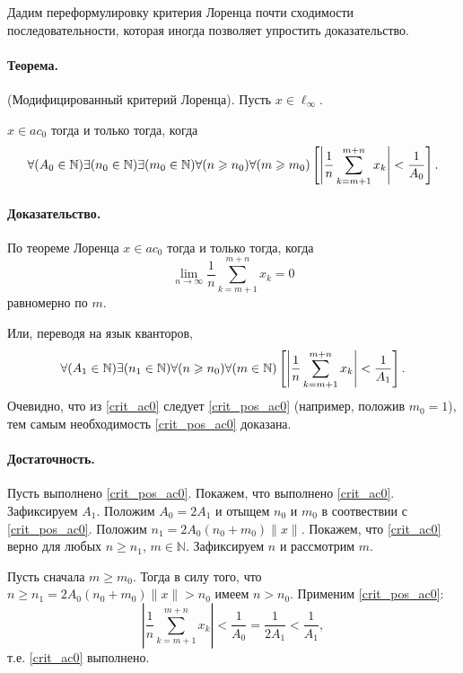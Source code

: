 Дадим переформулировку критерия Лоренца почти сходимости последовательности,
которая иногда позволяет упростить доказательство.


\paragraph{Теорема.}
(Модифицированный критерий Лоренца).
Пусть $x\in\ell_{\infty}$.

$x\in ac_0$ тогда и только тогда, когда
\begin{equation}\label{crit_pos_ac0}
	\forall(A_0\in\mathbb{N})
	\exists(n_0\in\mathbb{N})
	\exists(m_0\in\mathbb{N})
	\forall(n\geq n_0)
	\forall(m\geq m_0)
	\\
	\left[
		\left|
		\frac{1}{n}
		\sum_{k=m+1}^{m+n} x_k
		\right|
		<
		\frac{1}{A_0}
	\right]
	.
\end{equation}

\paragraph{Доказательство.}
По теореме Лоренца $x\in ac_0$ тогда и только тогда, когда
\begin{equation}\label{Lorencz_ac0}
	\lim_{n\to\infty} \frac{1}{n} \sum_{k=m+1}^{m+n} x_k = 0
\end{equation}
равномерно по $m$.

Или, переводя на язык кванторов,
\begin{equation}\label{crit_ac0}
	\forall(A_1\in\mathbb{N})
	\exists(n_1\in\mathbb{N})
	\forall(n\geq n_0)
	\forall(m \in \mathbb{N})
	\\
	\left[
		\left|
		\frac{1}{n}
		\sum_{k=m+1}^{m+n} x_k
		\right|
		<
		\frac{1}{A_1}
	\right]
	.
\end{equation}
Очевидно, что из \eqref{crit_ac0} следует \eqref{crit_pos_ac0} (например, положив $m_0 = 1$),
тем самым необходимость \eqref{crit_pos_ac0} доказана.

\paragraph{Достаточность.}
Пусть выполнено \eqref{crit_pos_ac0}.
Покажем, что выполнено \eqref{crit_ac0}.
Зафиксируем $A_1$.
Положим $A_0 = 2A_1$ и отыщем $n_0$ и $m_0$ в соотвествии с \eqref{crit_pos_ac0}.
Положим $n_1 = 2A_0(n_0+m_0)\|x\|$.
Покажем, что \eqref{crit_ac0} верно для любых $n\geq n_1$, $m\in \mathbb{N}$.
Зафиксируем $n$ и рассмотрим $m$.

Пусть сначала $m\geq m_0$.
Тогда в силу того, что $n\geq n_1 = 2A_0(n_0+m_0)\|x\| > n_0$ имеем $n>n_0$.
Применим \eqref{crit_pos_ac0}:
\begin{equation}
	\left|
	\frac{1}{n}
	\sum_{k=m+1}^{m+n} x_k
	\right|
	<
	\frac{1}{A_0}
	=
	\frac{1}{2A_1}
	<
	\frac{1}{A_1}
	,
\end{equation}
т.е. \eqref{crit_ac0} выполнено.

